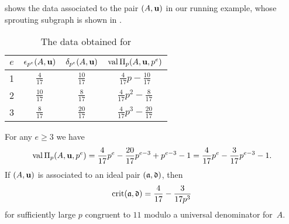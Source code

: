 \documentclass{amsart}
\begin{document}
\begin{example}
   \label{ex: ft.5}
    shows the data associated to the pair $(A,\mathbf{u})$ in our running example, whose sprouting subgraph is shown in .
   \begin{table}
      \begin{center}
         \begingroup
         \setlength{\tabcolsep}{8pt} %
         \renewcommand{\arraystretch}{1.4} %
         \begin{tabular}{cccc}
           \toprule
           $e$ & $\epsilon_{p^e}(A,\mathbf{u})$ & $\delta_{p^e}(A,\mathbf{u})$ & $\operatorname{val}\Pi_p(A,\mathbf{u},p^e)$ \\
           \midrule
           1 & $\frac{4}{17}$ & $\frac{10}{17}$ & $\frac{4}{17}p - \frac{10}{17}$\\
           2 & $\frac{10}{17}$ & $\frac{8}{17}$ & $\frac{4}{17}p^2 - \frac{8}{17}$ \\
           3 & $\frac{8}{17}$ & $\frac{20}{17}$ & $\frac{4}{17}p^3 - \frac{20}{17}$\\
           \bottomrule
         \end{tabular}
         \endgroup
      \end{center}
      \caption{The data obtained for }
      \label{table: running example data}
   \end{table}
   For any $e \ge 3$ we have
   \[
      \operatorname{val}\Pi_p(A,\mathbf{u},p^e) = \frac{4}{17}p^e - \frac{20}{17}p^{e-3} + p^{e-3} - 1
       = \frac{4}{17}p^e - \frac{3}{17}p^{e-3}  - 1.
    \]
    If $(A,\mathbf{u})$ is associated to an ideal pair $(\mathfrak{a},\mathfrak{d})$, then
    \[\operatorname{crit}(\mathfrak{a},\mathfrak{d}) = \frac{4}{17} - \frac{3}{17p^3}\]
    for sufficiently large $p$ congruent to $11$ modulo a universal denominator for~$A$.
\end{example}
\end{document}
